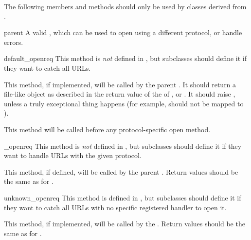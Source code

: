 The following members and methods should only be used by classes
derived from .  


\begin{memberdesc}[BaseHandler]{parent}
A valid , which can be used to open using a
different protocol, or handle errors.
\end{memberdesc}

\begin{methoddesc}[BaseHandler]{default_open}{req}
This method is \emph{not} defined in , but
subclasses should define it if they want to catch all URLs.

This method, if implemented, will be called by the parent
.  It should return a file-like object as
described in the return value of the  of
, or .  It should raise
, unless a truly exceptional thing happens (for
example,  should not be mapped to
).

This method will be called before any protocol-specific open method.
\end{methoddesc}

\begin{methoddescni}[BaseHandler]{_open}{req}
This method is \emph{not} defined in , but
subclasses should define it if they want to handle URLs with the given
protocol.

This method, if defined, will be called by the parent
.  Return values should be the same as for 
.
\end{methoddescni}

\begin{methoddesc}[BaseHandler]{unknown_open}{req}
This method is  defined in , but
subclasses should define it if they want to catch all URLs with no
specific registered handler to open it.

This method, if implemented, will be called by the  
.  Return values should be the same as for 
.
\end{methoddesc}

